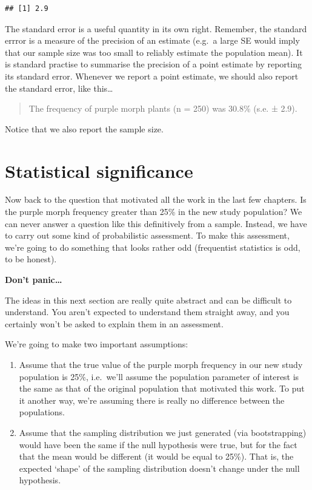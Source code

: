 \documentclass[]{book}
\begin{document}
\begin{verbatim}
## [1] 2.9
\end{verbatim}

The standard error is a useful quantity in its own right. Remember, the
standard errror is a measure of the precision of an estimate (e.g.~a
large SE would imply that our sample size was too small to reliably
estimate the population mean). It is standard practise to summarise the
precision of a point estimate by reporting its standard error. Whenever
we report a point estimate, we should also report the standard error,
like this\ldots{}

\begin{quote}
The frequency of purple morph plants (n = 250) was 30.8\% (s.e. ± 2.9).
\end{quote}

Notice that we also report the sample size.

\section{Statistical significance}\label{statistical-significance}

Now back to the question that motivated all the work in the last few
chapters. Is the purple morph frequency greater than 25\% in the new
study population? We can never answer a question like this definitively
from a sample. Instead, we have to carry out some kind of probabilistic
assessment. To make this assessment, we're going to do something that
looks rather odd (frequentist statistics is odd, to be honest).

\begin{do-something}
\textbf{Don't panic\ldots{}}

The ideas in this next section are really quite abstract and can be
difficult to understand. You aren't expected to understand them straight
away, and you certainly won't be asked to explain them in an assessment.
\end{do-something}

We're going to make two important assumptions:

\begin{enumerate}
\def\labelenumi{\arabic{enumi}.}
\item
  Assume that the true value of the purple morph frequency in our new
  study population is 25\%, i.e.~we'll assume the population parameter
  of interest is the same as that of the original population that
  motivated this work. To put it another way, we're assuming there is
  really no difference between the populations.
\item
  Assume that the sampling distribution we just generated (via
  bootstrapping) would have been the same if the null hypothesis were
  true, but for the fact that the mean would be different (it would be
  equal to 25\%). That is, the expected `shape' of the sampling
  distribution doesn't change under the null hypothesis.
\end{enumerate}
\end{document}
